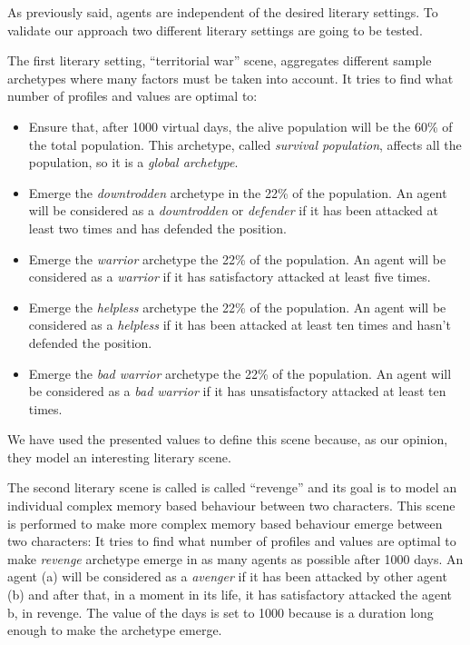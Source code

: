 \documentclass{sig-alternate}
\begin{document}
As previously said, agents are independent of the desired literary settings. To validate our approach two different literary settings are going to be tested.

The first literary setting, ``territorial war'' scene, aggregates different sample archetypes where many factors must be taken into account.  It tries to find what number of profiles and values are optimal to:
\begin{itemize}
\item Ensure that, after 1000 virtual days, the alive population will be the 60\% of the total population. This archetype, called \textit{survival population}, affects all the population, so it is a \textit{global archetype}.
\item Emerge the \textit{downtrodden} archetype in the 22\% of the
  population. An agent will be considered as a \textit{downtrodden} or
  \textit{defender} if it has been attacked at least two times and has
  defended the position.
\item Emerge the \textit{warrior} archetype the 22\% of the population. An agent will be considered as a \textit{warrior} if it has satisfactory attacked at least five times.
\item Emerge the \textit{helpless} archetype the 22\% of the population. An agent will be considered as a \textit{helpless}  if it has been attacked at least ten times and hasn't defended the position.
\item Emerge the \textit{bad warrior} archetype the 22\% of the population. An agent will be considered as a \textit{bad warrior}  if it has unsatisfactory attacked at least ten times.
\end{itemize}
We have used the presented values to define this scene because, as our opinion, they model an interesting literary scene.


The second literary scene is called is called ``revenge'' and its goal is to model an individual complex memory
based behaviour between two characters. This scene is performed to make more complex memory based behaviour emerge between two characters:  It tries to find what number of profiles and values are optimal to make \textit{revenge} archetype emerge in as many agents as possible after 1000 days.  An agent (a) will be considered as a \textit{avenger} if it has been attacked by other agent (b) and after that, in a moment in its life, it has satisfactory attacked the agent b, in revenge. The value of the days is set to 1000 because is a duration long enough to make the archetype emerge. 
\end{document}
